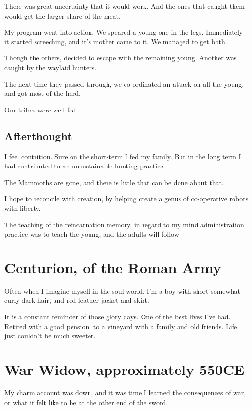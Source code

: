 There was great uncertainty that it would work. And the ones that caught them
would get the larger share of the meat. 

My program went into action. We speared a young one in the legs.
Immediately it started screeching, and it's mother came to it. 
We managed to get both.

Though the others, decided to escape with the remaining young. Another was
caught by the waylaid hunters.

The next time they passed through, we co-ordinated an attack on all the young, 
and got most of the herd. 

Our tribes were well fed. 

\section{Afterthought}

I feel contrition. Sure on the short-term I fed my family. But in the long term
I had contributed to an unsustainable hunting practice. 

The Mammoths are gone, and there is little that can be done about that. 

I hope to reconcile with creation, by helping create a genus of co-operative
robots with liberty. 

The teaching of the reincarnation memory, in regard to my mind administration
practice was to teach the young, and the adults will follow.
 
\chapter{Centurion, of the Roman Army}

Often when I imagine myself in the soul world, I'm a boy with short somewhat
curly dark hair, and red leather jacket and skirt. 

It is a constant reminder of those glory days. 
One of the best lives I've had. Retired with a good pension, to a vineyard with
a family and old friends. Life just couldn't be much sweeter. 

\chapter{War Widow, approximately 550CE} 
\label{reincarnation:widow}

My charm account was down, and it was time I learned the consequences of war, or
what it felt like to be at the other end of the sword. 

